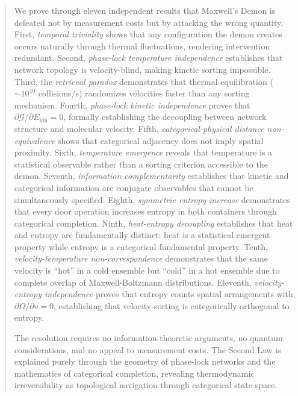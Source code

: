 \documentclass[twocolumn,showpacs,preprintnumbers,amsmath,amssymb,prd]{revtex4-2}
\theoremstyle{definition}
\theoremstyle{remark}
\newcommand{\phaselockgraph}{\mathcal{G}}
\begin{document}
\begin{abstract}
We prove through eleven independent results that Maxwell's Demon is defeated not by measurement costs but by attacking the wrong quantity. First, \textit{temporal triviality} shows that any configuration the demon creates occurs naturally through thermal fluctuations, rendering intervention redundant. Second, \textit{phase-lock temperature independence} establishes that network topology is velocity-blind, making kinetic sorting impossible. Third, the \textit{retrieval paradox} demonstrates that thermal equilibration ($\sim 10^{10}$ collisions/s) randomizes velocities faster than any sorting mechanism. Fourth, \textit{phase-lock kinetic independence} proves that $\partial \phaselockgraph/\partial E_{\text{kin}} = 0$, formally establishing the decoupling between network structure and molecular velocity. Fifth, \textit{categorical-physical distance non-equivalence} shows that categorical adjacency does not imply spatial proximity. Sixth, \textit{temperature emergence} reveals that temperature is a statistical observable rather than a sorting criterion accessible to the demon. Seventh, \textit{information complementarity} establishes that kinetic and categorical information are conjugate observables that cannot be simultaneously specified. Eighth, \textit{symmetric entropy increase} demonstrates that every door operation increases entropy in both containers through categorical completion. Ninth, \textit{heat-entropy decoupling} establishes that heat and entropy are fundamentally distinct: heat is a statistical emergent property while entropy is a categorical fundamental property. Tenth, \textit{velocity-temperature non-correspondence} demonstrates that the same velocity is ``hot'' in a cold ensemble but ``cold'' in a hot ensemble due to complete overlap of Maxwell-Boltzmann distributions. Eleventh, \textit{velocity-entropy independence} proves that entropy counts spatial arrangements with $\partial \Omega / \partial v = 0$, establishing that velocity-sorting is categorically orthogonal to entropy.

The resolution requires no information-theoretic arguments, no quantum considerations, and no appeal to measurement costs. The Second Law is explained purely through the geometry of phase-lock networks and the mathematics of categorical completion, revealing thermodynamic irreversibility as topological navigation through categorical state space.
\end{abstract}

\end{document}
